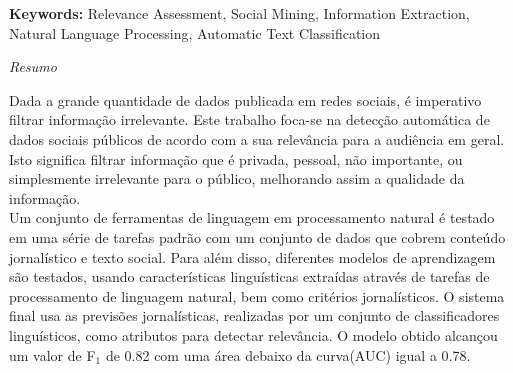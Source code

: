 \documentclass[11pt, a4paper, oneside]{thesis} %
\newcommand\blankpage{%
    \null
    \thispagestyle{empty}%
    \addtocounter{page}{-1}%
    \newpage}
\begin{document}

\textbf{Keywords: } \keywordnames Relevance Assessment, Social Mining, Information Extraction, Natural Language Processing, Automatic Text Classification 

\afterpage{\blankpage}
\clearpage %

\thispagestyle{empty}
  \begin{center}
    \setlength{\parskip}{0pt}
    {\huge{\textit{Resumo}} \par}
    \bigskip
  \end{center}


Dada a grande quantidade de dados publicada em redes sociais, é imperativo filtrar informação irrelevante. Este trabalho foca-se na detecção automática de dados sociais públicos de acordo com a sua relevância para a audiência em geral. Isto significa filtrar informação que é privada, pessoal, não importante, ou simplesmente irrelevante para o público, melhorando assim a qualidade da informação. \\
Um conjunto de ferramentas de linguagem em processamento natural é testado em uma série de tarefas padrão com um conjunto de dados que cobrem conteúdo jornalístico e texto social. Para além disso, diferentes modelos de aprendizagem são testados, usando características linguísticas extraídas através de tarefas de processamento de linguagem natural, bem como critérios jornalísticos. O sistema final usa as previsões jornalísticas, realizadas por um conjunto de classificadores linguísticos, como atributos para detectar relevância. O modelo obtido alcançou um valor de F$_1$ de 0.82 com uma área debaixo da curva(AUC) igual a 0.78.  
\end{document}
